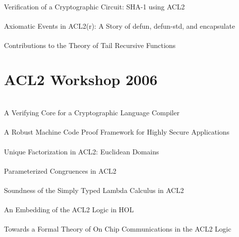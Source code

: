 \documentclass{article}
\begin{document}
\cite{04-toma-sha} \\
Verification of a Cryptographic Circuit: SHA-1 using ACL2 \\

\cite{04-gamboa-axiomatic} \\
Axiomatic Events in ACL2(r): A Story of defun, defun-std, and encapsulate \\

\cite{04-cowles-tail} \\
Contributions to the Theory of Tail Recursive Functions \\


\section{ACL2 Workshop 2006}

\cite{06-pike-cryptol} \\
A Verifying Core for a Cryptographic Language Compiler \\

\cite{06-hardin-framework} \\
A Robust Machine Code Proof Framework for Highly Secure Applications \\

\cite{06-cowles-factorization} \\
Unique Factorization in {ACL2}: {Euclidean} Domains \\

\cite{06-greve-parameterized} \\
Parameterized Congruences in {ACL2} \\

\cite{06-swords-stlc} \\
Soundness of the Simply Typed Lambda Calculus in {ACL2} \\

\cite{06-gordon-hol} \\
An Embedding of the {ACL2} Logic in {HOL} \\

\cite{06-schmaltz-chip} \\
Towards a Formal Theory of On Chip Communications in the {ACL2} Logic \\
\end{document}
